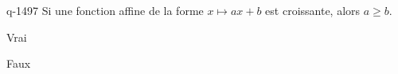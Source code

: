 \begin{truefalse}{q-1497}
Si une fonction affine de la forme $x\mapsto ax+b$ est croissante, alors $a\geq b$.
\item Vrai
\item* Faux
\end{truefalse}


